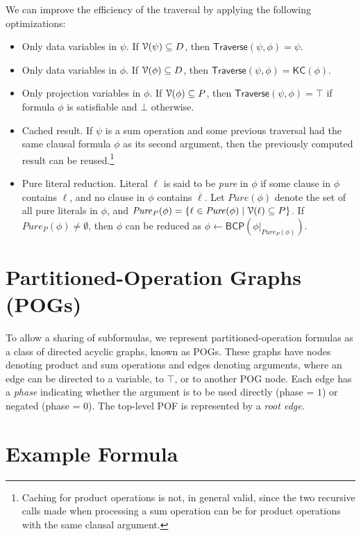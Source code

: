 \documentclass[letterpaper,USenglish,cleveref, autoref, thm-restate]{lipics-v2021}
\newcommand{\tautology}{\top}
\newcommand{\nil}{\bot}
\newcommand{\obar}[1]{\overline{#1}}
\newcommand{\lit}{\ell}
\newcommand{\dvarset}{D}
\newcommand{\pvarset}{P}
\newcommand{\dependencyset}{{\cal V}}
\newcommand{\pure}{\mathit{Pure}}
\newcommand{\simplify}[2]{#1|_{#2}}
\newcommand{\algo}[1]{\textsf{#1}}
\newcommand{\kc}{\algo{KC}}
\newcommand{\traverse}{\algo{Traverse}}
\newcommand{\bcp}{\algo{BCP}}
\begin{document}
We can improve the efficiency of the traversal by applying the following optimizations:
\begin{itemize}
\item Only data variables in $\psi$.  If $\dependencyset(\psi) \subseteq \dvarset$, then $\traverse(\psi, \phi) = \psi$.
\item Only data variables in $\phi$.  If $\dependencyset(\phi) \subseteq \dvarset$, then $\traverse(\psi, \phi) = \kc(\phi)$.
\item Only projection variables in $\phi$.  If $\dependencyset(\phi) \subseteq \pvarset$, then $\traverse(\psi, \phi) = \tautology$ if formula $\phi$ is satisfiable and $\nil$ otherwise.
\item Cached result. If $\psi$ is a sum operation and some previous traversal had the same clausal formula $\phi$ as its second argument, then the previously computed result can be reused.\footnote{
Caching for product operations is not, in general valid, since the two recursive calls made when processing a sum operation can be for product operations with the same clausal argument.}
\item Pure literal reduction.
Literal $\lit$ is said to be \emph{pure} in $\phi$ if some clause in $\phi$ contains $\lit$, and no clause in $\phi$ contains  $\obar{\lit}$.
Let $\pure(\phi)$ denote the set of all pure literals in $\phi$, and $\pure_{\pvarset}(\phi) = \{ \lit \in \pure(\phi) \mid  \dependencyset(\lit) \subseteq \pvarset \}$.
If $\pure_{\pvarset}(\phi) \not = \emptyset$, then $\phi$ can be reduced as
$\phi \leftarrow \bcp(\simplify{\phi}{\pure_{\pvarset}(\phi)})$.
\end{itemize}

\section{Partitioned-Operation Graphs (POGs)}

To allow a sharing of subformulas, we represent partitioned-operation
formulas as a class of directed acyclic graphs, known as POGs.  These
graphs have nodes denoting product and sum operations and edges
denoting arguments, where an edge can be directed to a variable, to
$\tautology$, or to another POG node.  Each edge has a \emph{phase}
indicating whether  the argument is to be used directly
(phase = $1$) or negated (phase = $0$).  The top-level POF is represented by a \emph{root edge}.


\section{Example Formula}
\end{document}
